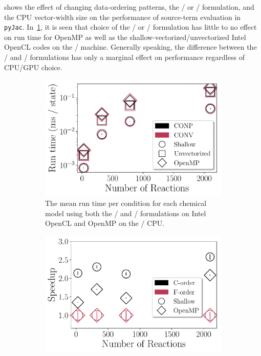 \documentclass[12pt,number,sort&compress,preprint]{elsarticle}
\begin{document}
 shows the effect of changing data-ordering patterns, the \conp/ or \conv/ formulation, and the CPU vector-width size on the performance of source-term evaluation in \texttt{pyJac}.
In~\cref{F:source_conpvsconv}, it is seen that choice of the \conp/ or \conv/ formulation has little to no effect on run time for OpenMP as well as the shallow-vectorized\slash unvectorized Intel OpenCL codes on the \avx/ machine.
Generally speaking, the difference between the \conp/ and \conv/ formulations has only a marginal effect on performance regardless of CPU\slash GPU choice.

\begin{figure}[htbp]
   \centering
  \begin{subfigure}[t]{0.48\linewidth}
      \includegraphics[width=\textwidth]{source_conpvsconv.pdf}
      \caption{The mean run time per condition for each chemical model using both the \conp/ and \conv/ formulations on Intel OpenCL and OpenMP on the \avx/ CPU.}
      \label{F:source_conpvsconv}
  \end{subfigure}
  \hfill
  \begin{subfigure}[t]{0.48\linewidth}
      \includegraphics[width=\textwidth]{source_cvsf.pdf}

\end{subfigure}
\end{figure}
\end{document}
